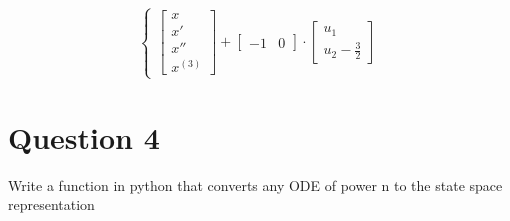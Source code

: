 \documentclass[12pt,letterpaper]{article}
\begin{document}
\begin{enumerate}[leftmargin=!,labelindent=5pt]
\begin{equation*}
\begin{cases}
            \left[\begin{matrix}x\\x'\\x''\\x^{(3)}\end{matrix}\right] + 
            \left[\begin{matrix}-1&0\end{matrix}\right] \cdot
            \left[\begin{matrix}u_1\\u_2 - \frac{3}{2}\end{matrix}\right]
         \end{cases}
     \end{equation*}
\end{enumerate}

\section*{Question 4}
\setcounter{equation}{0}
\begin{enumerate}[leftmargin=!,labelindent=5pt]
    Write a function in python that converts any ODE of power n to the state space representation
\end{enumerate}
\end{document}
